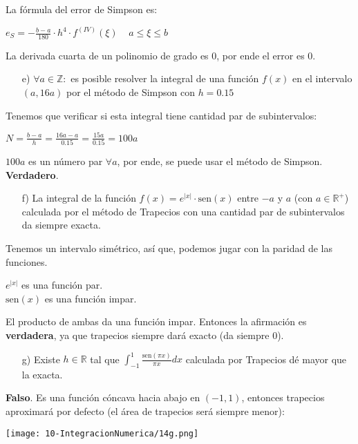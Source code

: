\documentclass[11pt]{article}
\def\sen{\mathrm{sen}}
\begin{document}
	La fórmula del error de Simpson es:
	
	$\displaystyle e_S=-\frac{b-a}{180}\cdot h^4 \cdot f^{(IV)}(\xi) \;\;\;\; a \le \xi \le b$
	
	La derivada cuarta de un polinomio de grado es 0, por ende el error es 0.\\
	
	\begin{itemize}
		\item[e)] $\forall a \in \mathbb{Z}:$ es posible resolver la integral de una función $f(x)$ en el intervalo $(a,16a)$ por el método de Simpson con $h=0.15$
	\end{itemize}

	Tenemos que verificar si esta integral tiene cantidad par de subintervalos:
	
	$\displaystyle N=\frac{b-a}{h}=\frac{16a-a}{0.15}=\frac{15a}{0.15}=100a$
	
	$100a$ es un número par $\forall a$, por ende, se puede usar el método de Simpson. \textbf{Verdadero}.\\
	
	\begin{itemize}
		\item[f)] La integral de la función $f(x)=e^{|x|}\cdot \sen(x)$ entre $-a$ y $a$ (con $a \in \mathbb{R}^+$) calculada por el método de Trapecios con una cantidad par de subintervalos da siempre exacta. 
	\end{itemize}

	Tenemos un intervalo simétrico, así que, podemos jugar con la paridad de las funciones.
	
	$e^{|x|}$ es una función par.\\
	$\sen(x)$ es una función impar.
	
	El producto de ambas da una función impar. Entonces la afirmación es \textbf{verdadera}, ya que trapecios siempre dará exacto (da siempre 0).\\
	
	\begin{itemize}
		\item[g)] Existe $h \in \mathbb{R}$ tal que $\displaystyle \int_{-1}^{1} \frac{\sen(\pi x)}{\pi x}dx$ calculada por Trapecios dé mayor que la exacta.
	\end{itemize}
	
	\textbf{Falso}. Es una función cóncava hacia abajo en $(-1,1)$, entonces trapecios aproximará por defecto (el área de trapecios será siempre menor):
	
	\texttt{[image: 10-IntegracionNumerica/14g.png]}\\
	
\end{document}
